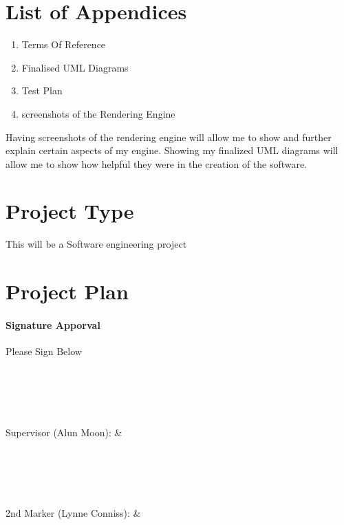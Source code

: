 \documentclass[]{article}
\begin{document}
\section{List of Appendices}
\begin{enumerate}
	\item Terms Of Reference
    \item Finalised UML Diagrams
    \item Test Plan
    \item screenshots of the Rendering Engine
\end{enumerate}
Having screenshots of the rendering engine will allow me to show and further explain certain aspects of my engine.
Showing my finalized UML diagrams will allow me to show how helpful they were in the creation of the software.

\section{Project Type}
This will be a Software engineering project
\section{Project Plan}
\noindent
{}
{}


\paragraph{Signature Apporval}Please Sign Below
\\
\\
\\
\\
\\
\\
Supervisor (Alun Moon): & \hrulefill 
\\
\\
\\
\\
\\
\\
2nd Marker (Lynne Conniss): & \hrulefill
\end{document}
